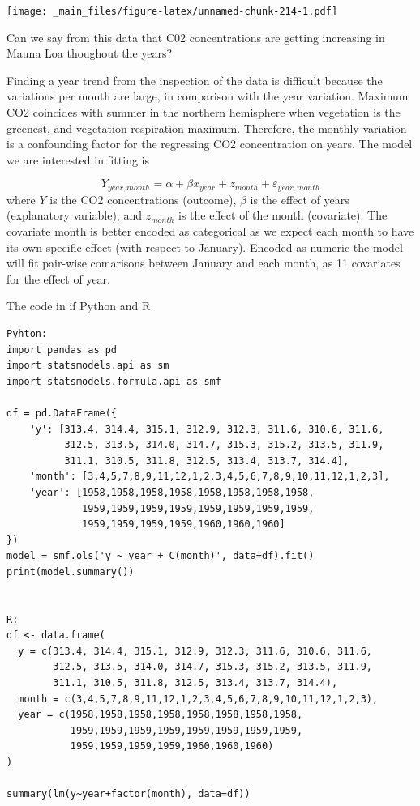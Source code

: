 \documentclass[
]{book}
\begin{document}
\texttt{[image: \_main\_files/figure-latex/unnamed-chunk-214-1.pdf]}

Can we say from this data that C02 concentrations are getting increasing in Mauna Loa thoughout the years?

Finding a year trend from the inspection of the data is difficult because the variations per month are large, in comparison with the year variation. Maximum CO2 coincides with summer in the northern hemisphere when vegetation is the greenest, and vegetation respiration maximum. Therefore, the monthly variation is a confounding factor for the regressing CO2 concentration on years. The model we are interested in fitting is

\[Y_{year, month} = \alpha + \beta x_{year} + z_{month}+\varepsilon_{year, month}\]
where \(Y\) is the CO2 concentrations (outcome), \(\beta\) is the effect of years (explanatory variable), and \(z_{month}\) is the effect of the month (covariate). The covariate month is better encoded as categorical as we expect each month to have its own specific effect (with respect to January). Encoded as numeric the model will fit pair-wise comarisons between January and each month, as 11 covariates for the effect of year.

The code in if Python and R

\begin{verbatim}
Pyhton:
import pandas as pd
import statsmodels.api as sm
import statsmodels.formula.api as smf

df = pd.DataFrame({
    'y': [313.4, 314.4, 315.1, 312.9, 312.3, 311.6, 310.6, 311.6,
          312.5, 313.5, 314.0, 314.7, 315.3, 315.2, 313.5, 311.9, 
          311.1, 310.5, 311.8, 312.5, 313.4, 313.7, 314.4],
    'month': [3,4,5,7,8,9,11,12,1,2,3,4,5,6,7,8,9,10,11,12,1,2,3],
    'year': [1958,1958,1958,1958,1958,1958,1958,1958,
             1959,1959,1959,1959,1959,1959,1959,1959,
             1959,1959,1959,1959,1960,1960,1960]
})
model = smf.ols('y ~ year + C(month)', data=df).fit()
print(model.summary())


R:
df <- data.frame(
  y = c(313.4, 314.4, 315.1, 312.9, 312.3, 311.6, 310.6, 311.6,
        312.5, 313.5, 314.0, 314.7, 315.3, 315.2, 313.5, 311.9, 
        311.1, 310.5, 311.8, 312.5, 313.4, 313.7, 314.4),
  month = c(3,4,5,7,8,9,11,12,1,2,3,4,5,6,7,8,9,10,11,12,1,2,3),
  year = c(1958,1958,1958,1958,1958,1958,1958,1958,
           1959,1959,1959,1959,1959,1959,1959,1959,
           1959,1959,1959,1959,1960,1960,1960)
)

summary(lm(y~year+factor(month), data=df))
\end{verbatim}
\end{document}

